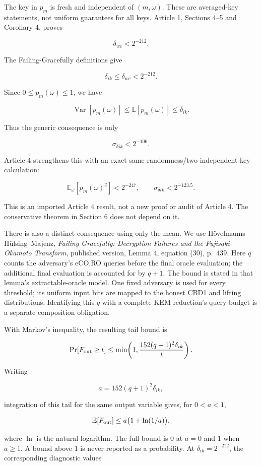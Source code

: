 \documentclass[11pt,a4paper]{article}
\begin{document}
The key in \(p_m\) is fresh and independent of \((m,\omega)\). These are averaged-key statements, not uniform guarantees for all keys. Article 1, Sections 4--5 and Corollary 4, proves

\[
\delta_{wc}<2^{-212}.
\]

The Failing-Gracefully definitions give

\[
\delta_{ik}\le\delta_{wc}<2^{-212}.
\]

Since \(0\le p_m(\omega)\le1\), we have

\[
\operatorname{Var}[p_m(\omega)]
\le
\mathbb E[p_m(\omega)]
\le
\delta_{ik}.
\]

Thus the generic consequence is only

\[
\sigma_{\delta ik}<2^{-106}.
\]

Article 4 strengthens this with an exact same-randomness/two-independent-key calculation:

\[
\mathbb E_\omega[p_m(\omega)^2]<2^{-247},
\qquad
\sigma_{\delta ik}<2^{-123.5}.
\]

This is an imported Article 4 result, not a new proof or audit of Article 4. The conservative theorem in Section 6 does not depend on it.

There is also a distinct consequence using only the mean. We use Hövelmanns--Hülsing--Majenz, \emph{Failing Gracefully: Decryption Failures and the Fujisaki--Okamoto Transform}, published version, Lemma 4, equation (30), p.~439. Here \(q\) counts the adversary's eCO.RO queries before the final oracle evaluation; the additional final evaluation is accounted for by \(q+1\). The bound is stated in that lemma's extractable-oracle model. One fixed adversary is used for every threshold; its uniform input bits are mapped to the honest CBD1 and lifting distributions. Identifying this \(q\) with a complete KEM reduction's query budget is a separate composition obligation.

With Markov's inequality, the resulting tail bound is

\[
\Pr[F_{\rm out}\ge t]
\le
\min\!\left(1,\frac{152(q+1)^2\delta_{ik}}{t}\right).
\]

Writing

\[
a=152(q+1)^2\delta_{ik},
\]

integration of this tail for the same output variable gives, for \(0<a<1\),

\[
\mathbb E[F_{\rm out}]
\le
a\bigl(1+\ln(1/a)\bigr),
\]

where \(\ln\) is the natural logarithm. The full bound is 0 at \(a=0\) and 1 when \(a\ge1\). A bound above 1 is never reported as a probability. At \(\delta_{ik}=2^{-212}\), the corresponding diagnostic values
\end{document}
